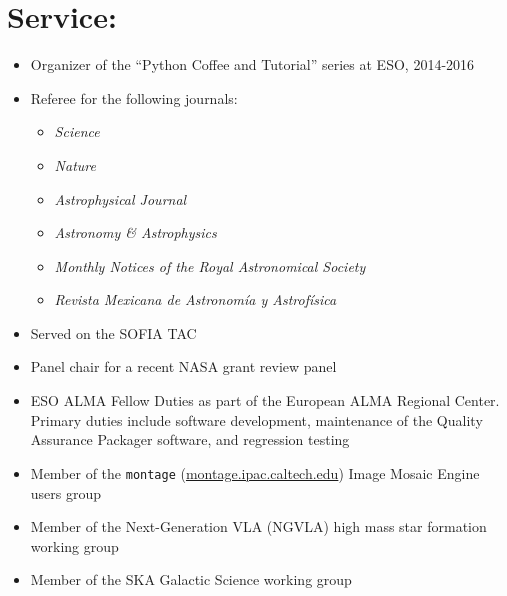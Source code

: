 
\section*{Service:}
\vspace{-10pt}
\begin{itemize}
\itemsep-3pt
        
    \item Organizer of the ``Python Coffee and Tutorial'' series at ESO, 2014-2016
    \item Referee for the following journals:
        \begin{itemize}
            \itemsep-3pt
            \item \textit{Science}
            \item \textit{Nature}
            \item \textit{Astrophysical Journal}
            \item \textit{Astronomy \& Astrophysics}
            \item \textit{Monthly Notices of the Royal Astronomical Society}
            \item \textit{Revista Mexicana de Astronom{\'i}a y Astrof{\'i}sica}
    \end{itemize}
    \item Served on the SOFIA TAC
    \item Panel chair for a recent NASA grant review panel
    \item ESO ALMA Fellow Duties as part of the European ALMA Regional Center.
        Primary duties include software development, maintenance of the
        Quality Assurance Packager software, and regression testing
    \item Member of the \texttt{montage} (\url{montage.ipac.caltech.edu}) Image
        Mosaic Engine users group
    \item Member of the Next-Generation VLA (NGVLA) high mass star formation
        working group
    \item Member of the SKA Galactic Science
        working group
\end{itemize}
